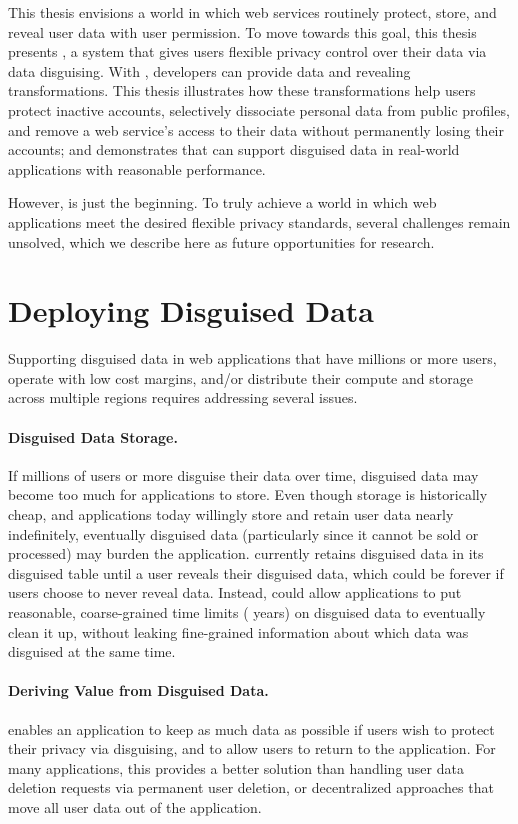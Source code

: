 This thesis envisions a world in which web services routinely
protect, store, and reveal \xxed user data with user permission.
%
To move towards this goal, this thesis presents \sys, a system that gives users 
flexible privacy control over their data via data disguising.
%
With \sys, developers can provide data \xxing and revealing transformations.
%
This thesis illustrates how these transformations help users protect
inactive accounts, selectively dissociate personal data from public profiles,
and remove a web service's access to their data without permanently losing their
accounts;
%
and demonstrates that \sys can support disguised data in real-world applications with
reasonable performance.
%

%
However, \sys is just the beginning. To truly achieve a world in which web
applications meet the desired flexible privacy standards, several
challenges remain unsolved, which we describe here as future
opportunities for research.
%

\section{Deploying Disguised Data}
\label{s:deploying}

Supporting disguised data in web applications that have millions or more users,
operate with low cost margins, and/or distribute their compute and storage
across multiple regions requires addressing several issues.

%
\paragraph{Disguised Data Storage.} If millions of users or more disguise
their data over time, disguised data may become too much for applications to
store.
%
Even though storage is historically cheap, and applications today willingly
store and retain user data nearly indefinitely, eventually disguised data
(particularly since it cannot be sold or processed) may burden the application.
%
\sys currently retains disguised data in its disguised table until a user
reveals their disguised data, which could be forever if users choose to never
reveal data.
%
Instead, \sys could allow applications to put reasonable, coarse-grained time
limits ( years) on disguised data to eventually clean it up, without
leaking fine-grained information about which data was disguised at the same
time.
%

%
\paragraph{Deriving Value from Disguised Data.} 
\sys enables an application to keep as much data as possible if users wish to
protect their privacy via disguising, and to allow users to return to the application.
For many applications, this provides a better solution than handling user data
deletion requests via permanent user deletion, or decentralized approaches that
move all user data out of the application.


